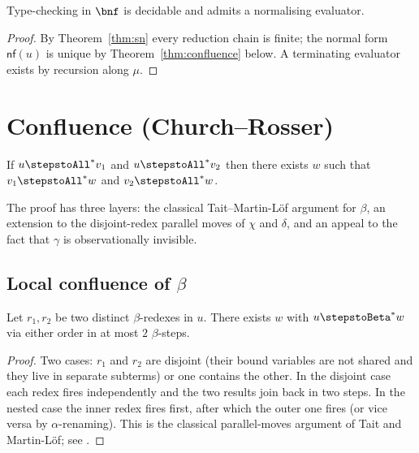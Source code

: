 \begin{corollary}
Type-checking in $\bnf$ is decidable and admits a normalising evaluator.
\end{corollary}
\begin{proof}
By Theorem~\ref{thm:sn} every reduction chain is finite; the normal form
$\mathsf{nf}(u)$ is unique by Theorem~\ref{thm:confluence} below. A
terminating evaluator exists by recursion along $\mu$.
\end{proof}

\section{Confluence (Church--Rosser)}
\label{sec:confluence}

\begin{theorem}
\label{thm:confluence}
If $u \stepstoAll^* v_1$ and $u \stepstoAll^* v_2$ then there exists
$w$ such that $v_1 \stepstoAll^* w$ and $v_2 \stepstoAll^* w$.
\end{theorem}

The proof has three layers: the classical Tait--Martin-L\"of argument for
$\beta$, an extension to the disjoint-redex parallel moves of $\chi$ and
$\delta$, and an appeal to the fact that $\gamma$ is observationally
invisible.

\subsection{Local confluence of $\beta$}

\begin{lemma}
\label{lem:beta-diamond}
Let $r_1, r_2$ be two distinct $\beta$-redexes in $u$. There exists $w$
with $u \stepstoBeta^* w$ via either order in at most $2$ $\beta$-steps.
\end{lemma}
\begin{proof}
Two cases: $r_1$ and $r_2$ are disjoint (their bound variables are not
shared and they live in separate subterms) or one contains the other. In
the disjoint case each redex fires independently and the two results join
back in two steps. In the nested case the inner redex fires first, after
which the outer one fires (or vice versa by $\alpha$-renaming). This is the
classical parallel-moves argument of Tait and Martin-L\"of; see
\cite[Chapter~3]{Barendregt1984}.
\end{proof}

